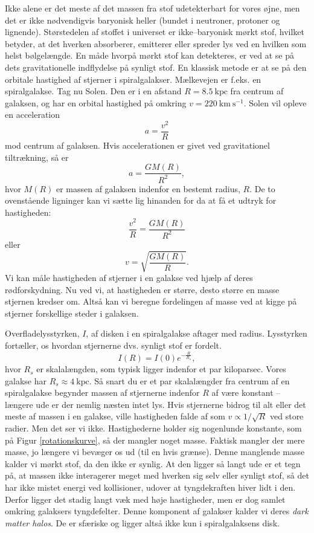 Ikke alene er det meste af det massen fra stof udetekterbart for vores øjne, men det er ikke nødvendigvis baryonisk heller (bundet i neutroner, protoner og lignende). Størstedelen af stoffet i universet er ikke--baryonisk mørkt stof, hvilket betyder, at det hverken absorberer, emitterer eller spreder lys ved en hvilken som helst bølgelængde. En måde hvorpå mørkt stof kan detekteres, er ved at se på dets gravitationelle indflydelse på synligt stof. En klassisk metode er at se på den orbitale hastighed af stjerner i spiralgalakser. Mælkevejen er f.eks. en spiralgalakse. Tag nu Solen. Den er i en afstand $R=8.5~\text{kpc}$ fra centrum af galaksen, og har en orbital hastighed på omkring $v=220~\text{km}~\text{s}^{-1}$. Solen vil opleve en acceleration
\begin{equation}
a = \frac{v^2}{R} 
\end{equation}
mod centrum af galaksen. Hvis accelerationen er givet ved gravitationel tiltrækning, så er
\begin{equation}
a = \frac{G M(R)}{R^2},
\end{equation}
hvor $M(R)$ er massen af galaksen indenfor en bestemt radius, $R$. De to ovenstående ligninger kan vi sætte lig hinanden for da at få et udtryk for hastigheden:
\begin{equation}
\frac{v^2}{R} = \frac{G M(R)}{R^2}
\end{equation}
eller
\begin{equation}
v = \sqrt{\frac{G M(R)}{R}}.
\end{equation}
Vi kan måle hastigheden af stjerner i en galakse ved hjælp af deres rødforskydning. Nu ved vi, at hastigheden er større, desto større en masse stjernen kredser om. Altså kan vi beregne fordelingen af masse ved at kigge på stjerner forskellige steder i galaksen.

Overfladelysstyrken, $I$, af disken i en spiralgalakse aftager med radius. Lysstyrken fortæller, os hvordan stjernerne dvs. synligt stof er fordelt.
\begin{equation}
I(R) = I(0) e^{-\frac{R}{R_s}},
\end{equation}
hvor $R_s$ er skalalængden, som typisk ligger indenfor et par kiloparsec. Vores galakse har $R_s\approx 4~\text{kpc}$. Så snart du er et par skalalængder fra centrum af en spiralgalakse begynder massen af stjernerne indenfor $R$ af være konstant -- længere ude er der nemlig næsten intet lys. Hvis stjernerne bidrog til alt eller det meste af massen i en galakse, ville hastigheden falde af som $v \propto 1/\sqrt{R}$ ved store radier. Men det ser vi ikke. Hastighederne holder sig nogenlunde konstante, som på Figur \ref{rotationskurve}, så der mangler noget masse. Faktisk mangler der mere masse, jo længere vi bevæger os ud (til en hvis grænse). Denne manglende masse kalder vi mørkt stof, da den ikke er synlig. At den ligger så langt ude er et tegn på, at massen ikke interagerer meget med hverken sig selv eller synligt stof, så det har ikke mistet energi ved kollisioner, udover at tyngdekraften hiver lidt i den. Derfor ligger det stadig langt væk med høje hastigheder, men er dog samlet omkring galaksers tyngdefelter. Denne komponent af galakser kalder vi deres \emph{dark matter halos}. De er sfæriske og ligger altså ikke kun i spiralgalaksens disk.


